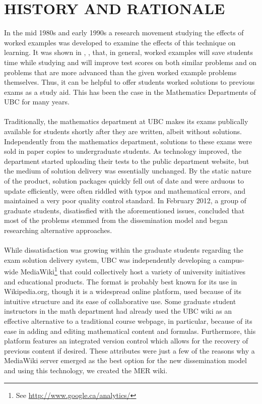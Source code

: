 \documentclass{primus}
\begin{document}
\section{HISTORY AND RATIONALE}\label{sec:History_and_Rationale}
In the mid 1980s and early 1990s  a research movement studying the effects of worked examples was developed to examine the effects of this technique on learning. It was shown in \cite{CS1}, \cite{CS2}, \cite{PM} that, in general, worked examples will save students time while studying and will improve test scores on both similar problems and on problems that are more advanced than the given worked example problems themselves. Thus, it can be helpful to offer students worked solutions to previous exams as a study aid. This has been the case in the Mathematics Departments of UBC for many years.
\\\\  
\noindent{}Traditionally, the mathematics department at UBC makes its exams publically available for students shortly after they are written, albeit without solutions.  Independently from the mathematics department, solutions to these exams were sold in paper copies to undergraduate students.  As technology improved, the department started uploading their tests to the public department website, but the medium of solution delivery was essentially unchanged.  By the static nature of the product, solution packages quickly fell out of date and were arduous to update efficiently, were often riddled with typos and mathematical errors, and maintained a very poor quality control standard.  In February 2012, a group of graduate students, disatissfied with the aforementioned issues, concluded that most of the problems stemmed from the dissemination model and began researching alternative approaches.
\\\\  
\noindent{}While dissatisfaction was growing within the graduate students regarding the exam solution delivery system, UBC was independently developing a campus-wide MediaWiki\footnote{\label{ft:analytics} See \url{http://www.google.ca/analytics/}} that could collectively host a variety of university initiatives and educational products.  The format is probably best known for its use in Wikipedia.org, though it is a widespread online platform, used because of its intuitive structure and its ease of collaborative use.  Some graduate student instructors in the math department had already used the UBC wiki as an effective alternative to a traditional course webpage, in particular, because of its ease in adding and editing mathematical content and formulas.  Furthermore, this platform features an integrated version control which allows for the recovery of previous content if desired. These attributes were just a few of the reasons why a MediaWiki server emerged as the best option for the new dissemination model and using this technology, we created the MER wiki.
\end{document}
